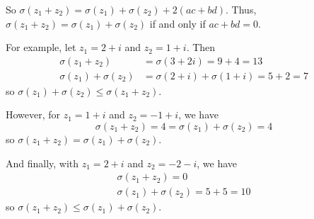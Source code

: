 \documentclass[12pt]{article}
\begin{document}
\begin{enumerate}[(a)]
            So $\sigma(z_1 + z_2) = \sigma(z_1) + \sigma(z_2) + 2(ac + bd)$. Thus, $\sigma(z_1 + z_2) = \sigma(z_1) + \sigma(z_2)$ if and only if $ac + bd = 0$.

            For example, let $z_1 = 2 + i$ and $z_2 = 1 + i$. Then
            \begin{align*}
                \sigma(z_1 + z_2) &= \sigma(3 + 2i) = 9 + 4 = 13\\
                \sigma(z_1) + \sigma(z_2) &= \sigma(2 + i) + \sigma(1 + i) = 5 + 2 = 7
            \end{align*}
            so $\sigma(z_1) + \sigma(z_2) \leq \sigma(z_1 + z_2)$.

            However, for $z_1 = 1 + i$ and $z_2 = -1 + i$, we have
            \[\sigma(z_1 + z_2) = 4 = \sigma(z_1) + \sigma(z_2) = 4\]
            so $\sigma(z_1 + z_2) = \sigma(z_1) + \sigma(z_2)$.

            And finally, with $z_1 = 2 + i$ and $z_2 = -2 - i$, we have
            \begin{align*}
                \sigma(z_1 + z_2) = 0\\ 
                \sigma(z_1) + \sigma(z_2) = 5 + 5 = 10
            \end{align*}
            so $\sigma(z_1 + z_2) \leq \sigma(z_1) + \sigma(z_2)$.
        \color{black}
\end{enumerate}
\pagebreak
\end{document}
